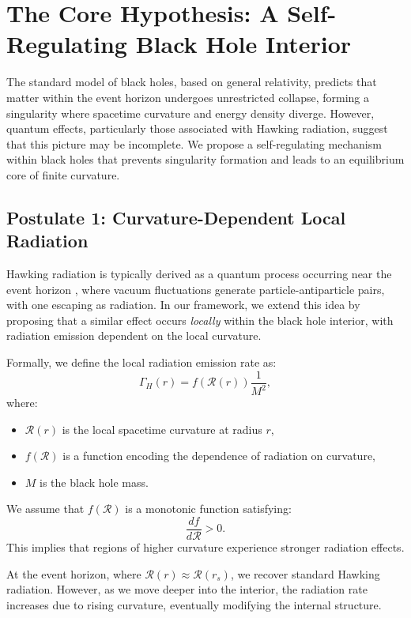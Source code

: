 \section{The Core Hypothesis: A Self-Regulating Black Hole Interior}
\label{sec:core_hypothesis}

The standard model of black holes, based on general relativity, predicts that matter within the event horizon undergoes unrestricted collapse, forming a singularity where spacetime curvature and energy density diverge. However, quantum effects, particularly those associated with Hawking radiation, suggest that this picture may be incomplete. We propose a self-regulating mechanism within black holes that prevents singularity formation and leads to an equilibrium core of finite curvature.

\subsection{Postulate 1: Curvature-Dependent Local Radiation}
Hawking radiation is typically derived as a quantum process occurring near the event horizon \cite{hawking1975particle}, where vacuum fluctuations generate particle-antiparticle pairs, with one escaping as radiation. In our framework, we extend this idea by proposing that a similar effect occurs \textit{locally} within the black hole interior, with radiation emission dependent on the local curvature.

Formally, we define the local radiation emission rate as:
\begin{equation}
    \Gamma_H(r) = f(\mathcal{R}(r)) \frac{1}{M^2},
\end{equation}
where:
\begin{itemize}
    \item \( \mathcal{R}(r) \) is the local spacetime curvature at radius \( r \),
    \item \( f(\mathcal{R}) \) is a function encoding the dependence of radiation on curvature,
    \item \( M \) is the black hole mass.
\end{itemize}

We assume that \( f(\mathcal{R}) \) is a monotonic function satisfying:
\begin{equation}
    \frac{df}{d\mathcal{R}} > 0.
\end{equation}
This implies that regions of higher curvature experience stronger radiation effects. 

At the event horizon, where \( \mathcal{R}(r) \approx \mathcal{R}(r_s) \), we recover standard Hawking radiation. However, as we move deeper into the interior, the radiation rate increases due to rising curvature, eventually modifying the internal structure.

